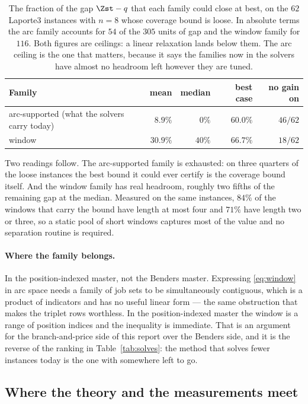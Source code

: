 \begin{table}[h]\centering
\footnotesize
\begin{tabular}{@{}lrrrr@{}}
\toprule
Family & mean & median & best case & no gain on\\
\midrule
arc-supported (what the solvers carry today) & $8.9\%$  & $0\%$  & $60.0\%$ & $46/62$\\
window                                       & $30.9\%$ & $40\%$ & $66.7\%$ & $18/62$\\
\bottomrule
\end{tabular}
\caption{The fraction of the gap $\Zst-q$ that each family could close at best, on the
$62$ Laporte3 instances with $n=8$ whose coverage bound is loose. In absolute terms the
arc family accounts for $54$ of the $305$ units of gap and the window family for $116$.
Both figures are ceilings: a linear relaxation lands below them. The arc ceiling is the
one that matters, because it says the families now in the solvers have almost no
headroom left however they are tuned.}
\label{tab:ceilings}
\end{table}

Two readings follow. The arc-supported family is exhausted: on three quarters of the
loose instances the best bound it could ever certify is the coverage bound itself. And
the window family has real headroom, roughly two fifths of the remaining gap at the
median. Measured on the same instances, $84\%$ of the windows that carry the bound have
length at most four and $71\%$ have length two or three, so a static pool of short
windows captures most of the value and no separation routine is required.

\paragraph{Where the family belongs.}
In the position-indexed master, not the Benders master. Expressing \eqref{eq:window} in arc space needs a family of job
sets to be simultaneously contiguous, which is a product of indicators and has no useful
linear form --- the same obstruction that makes the triplet rows worthless. In the
position-indexed master the window is a range of position indices and the inequality is
immediate. That is an argument for the branch-and-price side of this report over the
Benders side, and it is the reverse of the ranking in Table~\ref{tab:solves}: the method
that solves fewer instances today is the one with somewhere left to go.

\subsection{Where the theory and the measurements meet}\label{ssec:disc-agree}

